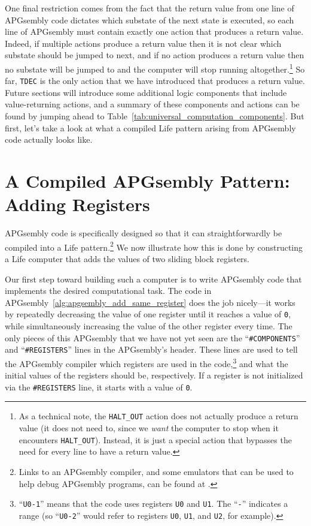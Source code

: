 One final restriction comes from the fact that the return value from one line of APGsembly code dictates which substate of the next state is executed, so each line of APGsembly must contain exactly one action that produces a return value. Indeed, if multiple actions produce a return value then it is not clear which substate should be jumped to next, and if no action produces a return value then no substate will be jumped to and the computer will stop running altogether.\footnote{As a technical note, the \texttt{HALT\_OUT} action does not actually produce a return value (it does not need to, since we \emph{want} the computer to stop when it encounters \texttt{HALT\_OUT}). Instead, it is just a special action that bypasses the need for every line to have a return value.} So far, \texttt{TDEC} is the only action that we have introduced that produces a return value. Future sections will introduce some additional logic components that include value-returning actions, and a summary of these components and actions can be found by jumping ahead to Table~\ref{tab:universal_computation_components}. But first, let's take a look at what a compiled Life pattern arising from APGsembly code actually looks like.


\section{A Compiled APGsembly Pattern: Adding Registers}\label{sec:compiled_add_two_registers}

APGsembly code is specifically designed so that it can straightforwardly be compiled into a Life pattern.\footnote{Links to an APGsembly compiler, and some emulators that can be used to help debug APGsembly programs, can be found at .} We now illustrate how this is done by constructing a Life computer that adds the values of two sliding block registers.

Our first step toward building such a computer is to write APGsembly code that implements the desired computational task. The code in APGsembly~\ref{alg:apgsembly_add_same_register} does the job nicely---it works by repeatedly decreasing the value of one register until it reaches a value of \texttt{0}, while simultaneously increasing the value of the other register every time. The only pieces of this APGsembly that we have not yet seen are the ``\texttt{\#COMPONENTS}'' and ``\texttt{\#REGISTERS}'' lines in the APGsembly's header. These lines are used to tell the APGsembly compiler which registers are used in the code,\footnote{``\texttt{U0-1}'' means that the code uses registers \texttt{U0} and \texttt{U1}. The ``\texttt{-}'' indicates a range (so ``\texttt{U0-2}'' would refer to registers \texttt{U0}, \texttt{U1}, and \texttt{U2}, for example).} and what the initial values of the registers should be, respectively. If a register is not initialized via the \texttt{\#REGISTERS} line, it starts with a value of \texttt{0}.

